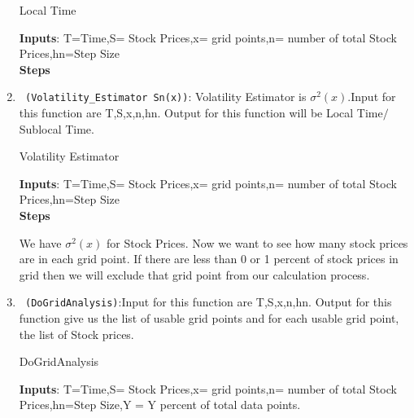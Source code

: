 \begin{enumerate}
  \begin{algorithm}
  \caption{Local Time}
  \bigskip
  \textbf{Inputs}: T=Time,S= Stock Prices,x= grid points,n= number of total Stock Prices,hn=Step Size\\
  \textbf{Steps}
  \end{algorithm}
  \item \verb! (Volatility_Estimator Sn(x))!: Volatility Estimator is $\sigma^2(x)$.Input for this function are T,S,x,n,hn.
 Output for this function will be Local Time$/$Sublocal Time.
  \begin{algorithm}
  \caption{Volatility Estimator}
  \bigskip
  \textbf{Inputs}: T=Time,S= Stock Prices,x= grid points,n= number of total Stock Prices,hn=Step Size\\
  \textbf{Steps}
  \end{algorithm}
 We have $\sigma^2(x)$ for Stock Prices. Now we want to see how many stock prices are in each grid point. 
 If there are less than 0 or 1 percent of stock prices in grid then we will exclude that grid point from
 our calculation process.
 \item \verb! (DoGridAnalysis)!:Input for this function are T,S,x,n,hn.
 Output for this function give us the list of usable grid points and for each usable grid point, the list of Stock prices.
  \begin{algorithm}
  \caption{DoGridAnalysis}
  \bigskip
  \textbf{Inputs}: T=Time,S= Stock Prices,x= grid points,n= number of total Stock Prices,hn=Step Size,Y = Y percent of total data points.\\

\end{algorithm}
\end{enumerate}
